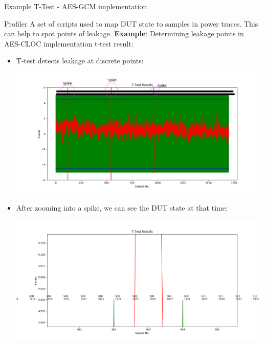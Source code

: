 \documentclass[xcolor=pdftex,dvipsnames,table,final]{beamer}
\begin{document}
\begin{frame}[fragile]{}
\begin{columns}[t]
\begin{column}{.31\linewidth}
\begin{block}{Example T-Test - AES-GCM implementation}
\begin{minipage}{0.5\linewidth}
        \end{minipage}
        
         
      \end{block}

      \begin{block}{Profiler}
         \vspace{-1ex}
         A set of scripts used to map DUT state to samples in power traces. This can help to spot points of leakage. \newline
         \textbf{Example}: Determining leakage points in AES-CLOC implementation t-test result:
         \begin{itemize}
         \item T-test detects leakage at discrete points:
          \begin{center}
          \includegraphics[scale=0.5]{images/profiler_1.png}
          \end{center}
          \item After zooming into a spike, we can see the DUT state at that time:
     \begin{center}
          \includegraphics[scale=0.5]{images/profiler_2.png}
          \end{center}

\end{itemize}
\end{block}
\end{column}
\end{columns}
\end{frame}
\end{document}
